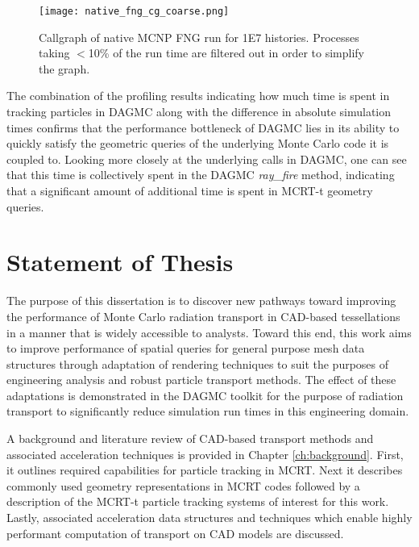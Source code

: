 \begin{figure}[H]
  \centering
  \caption[Callgraph of a native MCNP simulation.]{Callgraph of native MCNP FNG run for \num{1E7} histories. Processes taking
    $<$10\% of the run time are filtered out in order to simplify the graph.}
  \label{mcnp-fng-coarse}
  \texttt{[image: native\_fng\_cg\_coarse.png]}
\end{figure}

The combination of the profiling results indicating how much time is spent in
tracking particles in DAGMC along with the difference in absolute simulation times
confirms that the performance bottleneck of DAGMC lies in its ability to quickly
satisfy the geometric queries of the underlying Monte Carlo code it is coupled
to. Looking more closely at the underlying calls in DAGMC, one can see that this
time is collectively spent in the DAGMC \textit{ray\_fire} method,
indicating that a significant amount of additional time is spent in
MCRT-t geometry queries.


\section{Statement of Thesis}

The purpose of this dissertation is to discover new pathways toward
improving the performance of Monte Carlo radiation transport in CAD-based tessellations
in a manner that is widely accessible to analysts. Toward this end, this
work aims to improve performance of spatial queries for general purpose mesh
data structures through adaptation of rendering techniques to suit the purposes
of engineering analysis and robust particle transport methods. The effect of
these adaptations is demonstrated in the DAGMC toolkit for the purpose of radiation
transport to significantly reduce simulation run times in this engineering domain.

A background and literature review of CAD-based transport methods and associated
acceleration techniques is provided in Chapter \ref{ch:background}. First, it
outlines required capabilities for particle tracking in MCRT. Next it describes 
commonly used geometry representations in MCRT codes followed by a description
of the MCRT-t particle tracking systems of interest for this work. Lastly,
associated acceleration data structures and techniques which enable highly performant
computation of transport on CAD models are discussed.

